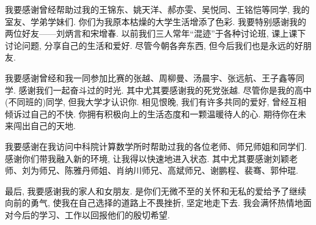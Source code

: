 \par 我要感谢曾经帮助过我的王锦东、姚天洋、郝亦雯、吴悦同、王铭恺等同学, 我的室友、学弟学妹们. 你们为我原本枯燥的大学生活增添了色彩. 我要特别感谢我的两位好友——刘炳言和宋增春. 以前我们三人常年``混迹''于各种讨论班, 课上课下讨论问题, 分享自己的生活和爱好. 尽管今朝各奔东西, 但今后我们也是永远的好朋友. 
\par 我要感谢曾经和我一同参加比赛的张越、周柳曼、汤晨宇、张远航、王子鑫等同学. 感谢我们一起奋斗过的时光. 其中尤其要感谢我的死党张越. 尽管你是我的高中(不同班的)同学, 但我大学才认识你. 相见恨晚, 我们有许多共同的爱好, 曾经互相倾诉过自己的不快. 你拥有积极向上的生活态度和一颗温暖待人的心. 期待你在未来闯出自己的天地.
\par 我要感谢在我访问中科院计算数学所时帮助过我的各位老师、师兄师姐和同学们. 感谢你们带我融入新的环境, 让我得以快速地进入状态. 其中尤其要感谢刘颖老师、刘为师兄、陈雅丹师姐、肖纳川师兄、高斌师兄、谢鹏程、裴骞、郭仲琨.
\par 最后, 我要感谢我的家人和女朋友. 是你们无微不至的关怀和无私的爱给予了继续向前的勇气, 使我在自己选择的道路上不畏挫折, 坚定地走下去. 我会满怀热情地面对今后的学习、工作以回报他们的殷切希望.